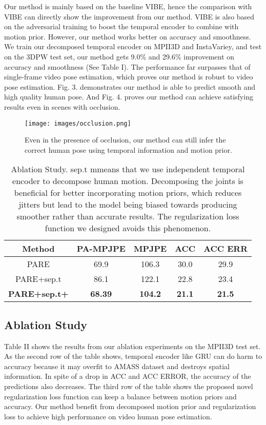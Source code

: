 \documentclass{svproc}
\begin{document}
Our method is mainly based on the baseline VIBE, hence the comparison with VIBE can directly show the improvement from our method. VIBE is also based on the adversarial training to boost the temporal encoder to combine with motion prior. However, our method works better on accuracy and smoothness. We train our decomposed temporal encoder on MPII3D and InstaVariey, and test on the 3DPW test set, our method gets 9.0\% and 29.6\% improvement on accuracy and smoothness (See Table I). The performance far surpasses that of single-frame video pose estimation, which proves our method is robust to video pose estimation. Fig. 3. demonstrates our method is able to predict smooth and high quality human pose. And Fig. 4. proves our method can achieve satisfying results even in scenes with occlusion.
\begin{figure}
    \centering
    \centerline{\texttt{[image: images/occlusion.png]}}
    \caption{Even in the presence of occlusion, our method can still infer the correct human pose using temporal information and motion prior.}
\end{figure}

\begin{table} 
\centering
\caption{Ablation Study. sep.t mmeans that we use independent temporal encoder to decompose human motion.  Decomposing the joints is beneficial for better incorporating motion priors, which reduces jitters but lead to the model being biased towards producing smoother rather than accurate results. The regularization loss function we designed avoids this phenomenon.}
\label{table}
\small
\setlength{\tabcolsep}{3pt}
\begin{tabular}{|c|c|c|c|c|}
\hline
Method& 
PA-MPJPE& 
MPJPE&
ACC&
ACC ERR\\
\hline
PARE& 
69.9&
106.3&
30.0&
29.9\\
\hline
PARE+sep.t& 
86.1&
122.1&
22.8&
23.4\\
\hline
\textbf{PARE+sep.t+}& 
\textbf{68.39}&
\textbf{104.2}&
\textbf{21.1}&
\textbf{21.5}\\
\hline
\end{tabular}
\label{tab1}
\end{table}




\subsection{Ablation Study}

Table II shows the results from our ablation experiments on the MPII3D test set. As the second row of the table shows, temporal encoder like GRU can do harm to accuracy because it may overfit to AMASS dataset and destroys spatial information. In spite of a drop in ACC and ACC ERROR, the accuracy of the predictions also decreases. The third row of the table shows the proposed novel regularization loss function can keep a balance between motion priors and accuracy. Our method benefit from decomposed motion prior and regularization loss to achieve high performance on video human pose estimation. 
\end{document}
